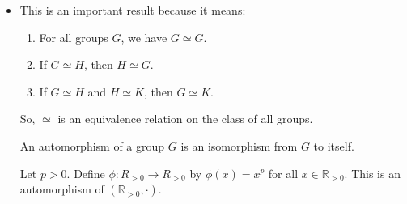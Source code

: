 \begin{itemize}
\begin{proof}
\begin{enumerate}
            Let $h_1,h_2 \in H$ and let $g_1 = \phi^{-1}(h_1)$ and $g_2= \phi^{-1}(h_2)$. Then:
            \begin{equation}
                \phi(g_1g_2)=\phi(g_1)\phi(g_2)
            \end{equation}
            since $\phi$ is an isomorphism. Therefore:
            \begin{equation}
                g_1g_2 = \phi^{-1}(\phi(g_1g_2))=\phi^{-1}(h_1h_2).
            \end{equation}
            Since $g_1 = \phi^{-1}(h_1)$ and $g_2=\phi^{-1}(h_2)$, we get:
            \begin{equation}
                \phi^{-1}(h_1h_2) = \phi^{-1}(h_1)\phi^{-1}(h_2)
            \end{equation}
            \item Let $\phi: G\rightarrow H$, $\psi: H\rightarrow K$ be isomorphisms. Then $\psi\phi:G\rightarrow K$ is a bijection since it is a composition of bijections.
            
            And for all $g_1,g_2 \in G$, we have:
            \begin{align}
                (\psi \circ \phi)(g_1g_2) &= \psi(\phi(g_1g_2)) \\ 
                &= \psi(\phi(g_1)\phi(g_2)) \\ 
                &= \psi(\phi(g_1)\psi(\phi(g_2)) \\ 
                &= (\psi \circ \phi)(g_1) (\psi \circ \phi)(g_2) 
            \end{align}
            Therefore $\psi \circ \phi$ is an isomorphism.
        \end{enumerate}
    \end{proof}
    \item This is an important result because it means:
    \begin{enumerate}
        \item For all groups $G$, we have $G \simeq G$.
        \item If $G \simeq H$, then $H \simeq G$.
        \item If $G \simeq H$ and $H\simeq K$, then $G \simeq K$.
    \end{enumerate} 
    So, $\simeq$ is an equivalence relation on the class of all groups.
    \begin{definition}
        An automorphism of a group $G$ is an isomorphism from $G$ to itself.
    \end{definition}
    \begin{example}
        Let $p>0$. Define $\phi:R_{>0}\rightarrow R_{>0}$ by $\phi(x)=x^p$ for all $x\in \mathbb{R}_{>0}$. This is an automorphism of $(\mathbb{R}_{>0}, \cdot)$.
        \vspace{2mm}


\end{example}
\end{itemize}
